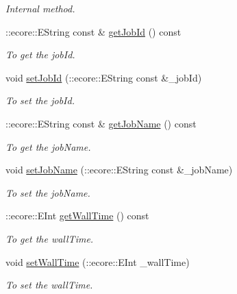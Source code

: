 \begin{DoxyCompactItemize}
\begin{DoxyCompactList}\small\item\em Internal method. \item\end{DoxyCompactList}\item 
::ecore::EString const \& \hyperlink{classTMS__Data_1_1Progression_aba01141701a4214a94fab99de3ad44e3}{getJobId} () const 
\begin{DoxyCompactList}\small\item\em To get the jobId. \item\end{DoxyCompactList}\item 
void \hyperlink{classTMS__Data_1_1Progression_a997be36fa5ad5f68fed8088d0fddf63d}{setJobId} (::ecore::EString const \&\_\-jobId)
\begin{DoxyCompactList}\small\item\em To set the jobId. \item\end{DoxyCompactList}\item 
::ecore::EString const \& \hyperlink{classTMS__Data_1_1Progression_a9d05de699c9ff69140fa6b16d3935591}{getJobName} () const 
\begin{DoxyCompactList}\small\item\em To get the jobName. \item\end{DoxyCompactList}\item 
void \hyperlink{classTMS__Data_1_1Progression_a47d85ba61c39cd5455960ba015329667}{setJobName} (::ecore::EString const \&\_\-jobName)
\begin{DoxyCompactList}\small\item\em To set the jobName. \item\end{DoxyCompactList}\item 
::ecore::EInt \hyperlink{classTMS__Data_1_1Progression_a42aa6e326a28d7aac1f162a278b224f9}{getWallTime} () const 
\begin{DoxyCompactList}\small\item\em To get the wallTime. \item\end{DoxyCompactList}\item 
void \hyperlink{classTMS__Data_1_1Progression_af03e57523b9f7c2f70c6c41a606162be}{setWallTime} (::ecore::EInt \_\-wallTime)
\begin{DoxyCompactList}\small\item\em To set the wallTime. \item\end{DoxyCompactList}\item 

\end{DoxyCompactItemize}
